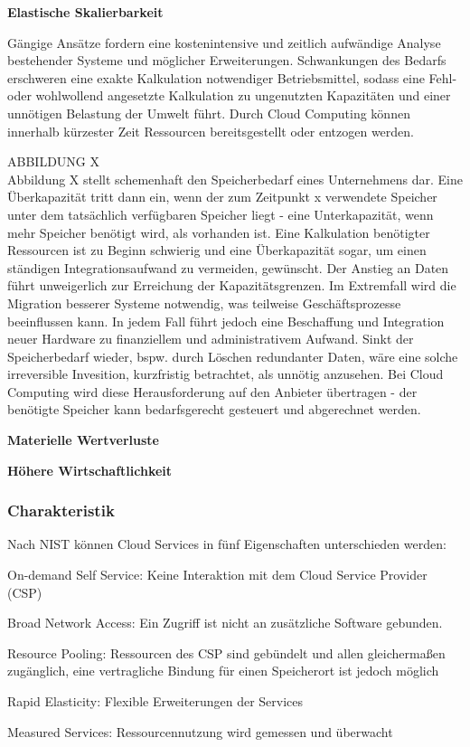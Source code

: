 \documentclass[12pt,a4paper,bibliography=totocnumbered,listof=totocnumbered]{scrartcl}
\begin{document}
\textbf{Elastische Skalierbarkeit}

Gängige Ansätze fordern eine kostenintensive und zeitlich aufwändige Analyse bestehender Systeme und möglicher Erweiterungen. Schwankungen des Bedarfs erschweren eine exakte Kalkulation notwendiger Betriebsmittel, sodass eine Fehl- oder wohlwollend angesetzte Kalkulation zu ungenutzten Kapazitäten und einer unnötigen Belastung der Umwelt führt. Durch Cloud Computing können innerhalb kürzester Zeit Ressourcen bereitsgestellt oder entzogen werden.

ABBILDUNG X\\
Abbildung X stellt schemenhaft den Speicherbedarf eines Unternehmens dar. Eine Überkapazität tritt dann ein, wenn der zum Zeitpunkt x verwendete Speicher unter dem tatsächlich verfügbaren Speicher liegt - eine Unterkapazität, wenn mehr Speicher benötigt wird, als vorhanden ist. Eine Kalkulation benötigter Ressourcen ist zu Beginn schwierig und eine Überkapazität sogar, um einen ständigen Integrationsaufwand zu vermeiden, gewünscht. Der Anstieg an Daten führt unweigerlich zur Erreichung der Kapazitätsgrenzen. Im Extremfall wird die Migration besserer Systeme notwendig, was teilweise Geschäftsprozesse beeinflussen kann. In jedem Fall führt jedoch eine Beschaffung und Integration neuer Hardware zu finanziellem und administrativem Aufwand. Sinkt der Speicherbedarf wieder, bspw. durch Löschen redundanter Daten, wäre eine solche irreversible Invesition, kurzfristig betrachtet, als unnötig anzusehen. Bei Cloud Computing wird diese Herausforderung auf den Anbieter übertragen - der benötigte Speicher kann bedarfsgerecht gesteuert und abgerechnet werden.

\textbf{Materielle Wertverluste}


\textbf{Höhere Wirtschaftlichkeit}



\cite{33} \cite{39}

\subsubsection{Charakteristik}
Nach NIST \cite{34} können Cloud Services in fünf Eigenschaften unterschieden werden:
\begin{compactitem}
	\item On-demand Self Service: Keine Interaktion mit dem Cloud Service Provider (CSP)
	\item Broad Network Access: Ein Zugriff ist nicht an zusätzliche Software gebunden.
	\item Resource Pooling: Ressourcen des CSP sind gebündelt und allen gleichermaßen zugänglich, eine vertragliche Bindung für einen Speicherort ist jedoch möglich
	\item Rapid Elasticity: Flexible Erweiterungen der Services
	\item Measured Services: Ressourcennutzung wird gemessen und überwacht
\end{compactitem}
\end{document}
